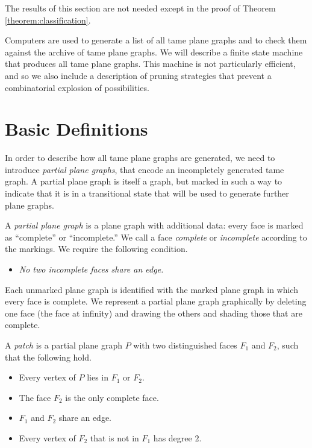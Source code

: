 The results of this section are not needed except in the proof of
Theorem \ref{theorem:classification}.

\smallskip

Computers are used to generate a list of all tame plane graphs and
to check them against the archive of tame plane graphs.  We will
describe a finite state machine that produces all tame plane
graphs. This machine is not particularly efficient, and so we also
include a description of pruning strategies that prevent a
combinatorial explosion of possibilities.


\section{Basic Definitions}

In order to describe how all tame plane graphs are generated, we
need to introduce {\it partial plane graphs}, that encode an
incompletely generated tame graph.  A partial plane graph is
itself a graph, but marked in such a way to indicate that it is in
a transitional state that will be used to generate further plane
graphs.

\begin{definition}
A {\it partial plane graph} is a plane graph with additional data:
every face is marked as ``complete'' or ``incomplete.'' We call a
face {\it complete\/} or {\it incomplete\/} according to the
markings. We require the following condition.
\begin{itemize}
  \item {\it No two incomplete faces share an edge.}
  \label{definition:partial (plane graph)}
\end{itemize}
\end{definition}

Each unmarked plane graph is identified with the marked plane
graph in which every face is complete. We represent a partial
plane graph graphically by deleting one face (the face at
infinity) and drawing the others and shading those that are
complete.

A {\it patch\/} is a partial plane graph $P$ with two
distinguished faces $F_1$ and $F_2$, such that the following hold.
\begin{itemize}
  \item Every vertex of $P$ lies in $F_1$ or $F_2$.
  \item The face $F_2$ is the only complete face.
  \item $F_1$ and $F_2$ share an edge.
  \item Every vertex of $F_2$ that is not in $F_1$
has degree $2$.
%
\end{itemize}

